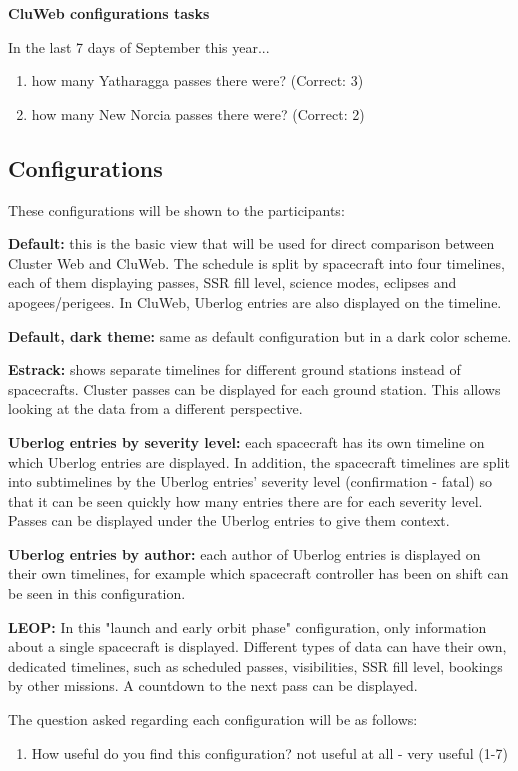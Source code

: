 \textbf{CluWeb configurations tasks}


In the last 7 days of September this year...
\begin{enumerate}
\item how many Yatharagga passes there were? (Correct: 3)
\item how many New Norcia passes there were? (Correct: 2)
\end{enumerate}

\subsection{Configurations} \label{configurations_section}
These configurations will be shown to the participants:

\textbf{Default:} this is the basic view that will be used for direct comparison between Cluster Web and CluWeb. The schedule is split by spacecraft into four timelines, each of them displaying passes, SSR fill level, science modes, eclipses and apogees/perigees. In CluWeb, Uberlog entries are also displayed on the timeline.

\textbf{Default, dark theme:} same as default configuration but in a dark color scheme.

\textbf{Estrack:} shows separate timelines for different ground stations instead of spacecrafts. Cluster passes can be displayed for each ground station. This allows looking at the data from a different perspective.

\textbf{Uberlog entries by severity level:} each spacecraft has its own timeline on which Uberlog entries are displayed. In addition, the spacecraft timelines are split into subtimelines by the Uberlog entries' severity level (confirmation - fatal) so that it can be seen quickly how many entries there are for each severity level. Passes can be displayed under the Uberlog entries to give them context.

\textbf{Uberlog entries by author:} each author of Uberlog entries is displayed on their own timelines, for example which spacecraft controller has been on shift can be seen in this configuration.

\textbf{LEOP:} In this "launch and early orbit phase" configuration, only information about a single spacecraft is displayed. Different types of data can have their own, dedicated timelines, such as scheduled passes, visibilities, SSR fill level, bookings by other missions. A countdown to the next pass can be displayed.

The question asked regarding each configuration will be as follows:
\begin{enumerate}
\item How useful do you find this configuration? not useful at all - very useful (1-7)
\end{enumerate}


